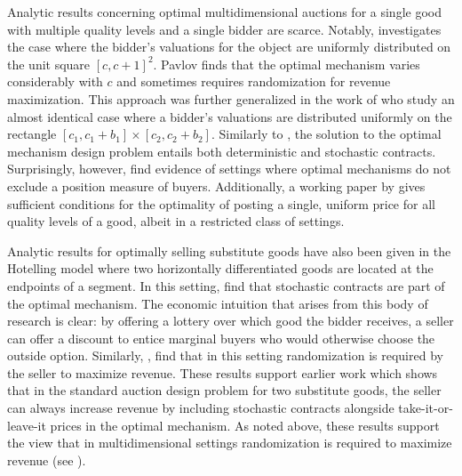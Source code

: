 Analytic results concerning optimal multidimensional auctions for a single good with multiple quality levels and a single bidder are scarce. Notably, \autocite{pavlov2011optimal} investigates the case where the bidder's valuations for the object are uniformly distributed on the unit square $[c,c+1]^2$. Pavlov finds that the optimal mechanism varies considerably with $c$ and sometimes requires randomization for revenue maximization. This approach was further generalized in the work of \autocite{thirumulanathan2019unitdemand} who study an almost identical case where a bidder's valuations are distributed uniformly on the rectangle $[c_1,c_1+b_1]\times[c_2,c_2+b_2]$. Similarly to \autocite{pavlov2011optimal}, the solution to the optimal mechanism design problem entails both deterministic and stochastic contracts. Surprisingly, however, \autocite{thirumulanathan2019unitdemand} find evidence of settings where optimal mechanisms do not exclude a position measure of buyers. Additionally, a working paper by \autocite{haghpanah2014} gives sufficient conditions for the optimality of posting a single, uniform price for all quality levels of a good, albeit in a restricted class of settings.

Analytic results for optimally selling substitute goods have also been given in the Hotelling model \autocite{hotelling1929} where two horizontally differentiated goods are located at the endpoints of a segment. In this setting, \autocite{balestrieri2020} find that stochastic contracts are part of the optimal mechanism. The economic intuition that arises from this body of research is clear: by offering a lottery over which good the bidder receives, a seller can offer a discount to entice marginal buyers who would otherwise choose the outside option. Similarly, \autocite{loertscher2023}, find that in this setting randomization is required by the seller to maximize revenue. These results support earlier work \autocite{thanassoulis2004} which shows that in the standard auction design problem for two substitute goods, the seller can always increase revenue by including stochastic contracts alongside take-it-or-leave-it prices in the optimal mechanism. As noted above, these results support the view that in multidimensional settings randomization is required to maximize revenue (see \cite{daskalakis2015multi}). 

